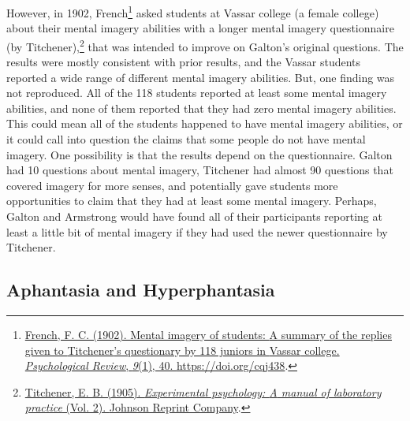 \documentclass[
  oneside,
  12pt]{crumpbook}
\begin{document}
However, in 1902, French\footnote{\protect\hyperlink{ref-frenchMentalImageryStudents1902}{French, F. C. (1902). Mental imagery of students: {A} summary of the replies given to {Titchener}'s questionary by 118 juniors in {Vassar} college. \emph{Psychological Review}, \emph{9}(1), 40. \url{https://doi.org/cqj438}}.} asked students at Vassar college (a female college) about their mental imagery abilities with a longer mental imagery questionnaire (by Titchener),\footnote{\protect\hyperlink{ref-titchenerExperimentalPsychologyManual1905}{Titchener, E. B. (1905). \emph{Experimental psychology: {A} manual of laboratory practice} (Vol. 2). {Johnson Reprint Company}}.} that was intended to improve on Galton's original questions. The results were mostly consistent with prior results, and the Vassar students reported a wide range of different mental imagery abilities. But, one finding was not reproduced. All of the 118 students reported at least some mental imagery abilities, and none of them reported that they had zero mental imagery abilities. This could mean all of the students happened to have mental imagery abilities, or it could call into question the claims that some people do not have mental imagery. One possibility is that the results depend on the questionnaire. Galton had 10 questions about mental imagery, Titchener had almost 90 questions that covered imagery for more senses, and potentially gave students more opportunities to claim that they had at least some mental imagery. Perhaps, Galton and Armstrong would have found all of their participants reporting at least a little bit of mental imagery if they had used the newer questionnaire by Titchener.

\hypertarget{aphantasia-and-hyperphantasia}{%
\subsection{Aphantasia and Hyperphantasia}\label{aphantasia-and-hyperphantasia}}
\end{document}
